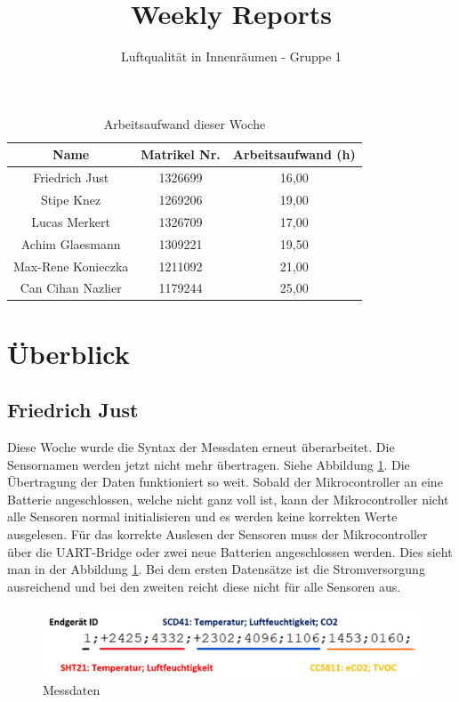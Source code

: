 \documentclass[]{article}
\title{Weekly Reports}
\author{Luftqualität in Innenräumen - Gruppe 1}
\begin{document}
\maketitle

\begin{table}[h!]
	\centering
	\begin{tabular}{|c|c|c|}
		\hline
		{\textbf{Name}}				&		{\textbf{Matrikel Nr.}} & {\textbf{Arbeitsaufwand (h)}} \\
		\hline
		Friedrich Just				&		1326699 				&		16,00\\
		\hline
		Stipe Knez					&		1269206 				&	19,00	\\
		\hline
		Lucas Merkert				&		1326709					&	17,00	\\
		\hline
		Achim Glaesmann				&		1309221					&	19,50	\\
		\hline
		Max-Rene Konieczka			&		1211092					&	21,00	\\
		\hline
		Can Cihan Nazlier			&		1179244					&	25,00	\\
		\hline
	\end{tabular}
	\caption{Arbeitsaufwand dieser Woche}
	\label{tab:worakload}
\end{table}



\section{Überblick}


\subsection{Friedrich Just}
Diese Woche wurde die Syntax der Messdaten erneut überarbeitet. Die Sensornamen werden jetzt nicht mehr übertragen. Siehe Abbildung \ref{img:Payload}. Die Übertragung der Daten funktioniert so weit. Sobald der Mikrocontroller an eine Batterie angeschlossen, welche nicht ganz voll ist, kann der Mikrocontroller nicht alle Sensoren normal initialisieren und es werden keine korrekten Werte ausgelesen. Für das korrekte Auslesen der Sensoren muss der Mikrocontroller über die UART-Bridge oder zwei neue Batterien angeschlossen werden. Dies sieht man in der  Abbildung \ref{img:Payload}. Bei dem ersten Datensätze ist die Stromversorgung ausreichend und bei den zweiten reicht diese nicht für alle Sensoren aus.  

\begin{figure}[!h]
	\centering
	\includegraphics[scale=0.40]{images/payload}
	\caption{Messdaten}
	\label{img:Payload}
\end{figure}
\end{document}
